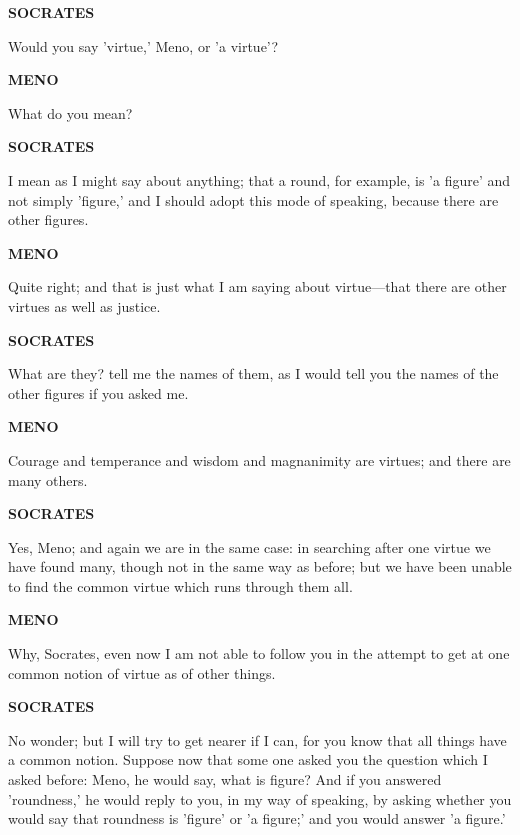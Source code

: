 \documentclass[11pt,letter]{article}
\begin{document}
\par \textbf{SOCRATES}
\par   Would you say 'virtue,' Meno, or 'a virtue'?

\par \textbf{MENO}
\par   What do you mean?

\par \textbf{SOCRATES}
\par   I mean as I might say about anything; that a round, for example, is 'a figure' and not simply 'figure,' and I should adopt this mode of speaking, because there are other figures.

\par \textbf{MENO}
\par   Quite right; and that is just what I am saying about virtue—that there are other virtues as well as justice.

\par \textbf{SOCRATES}
\par   What are they? tell me the names of them, as I would tell you the names of the other figures if you asked me.

\par \textbf{MENO}
\par   Courage and temperance and wisdom and magnanimity are virtues; and there are many others.

\par \textbf{SOCRATES}
\par   Yes, Meno; and again we are in the same case:  in searching after one virtue we have found many, though not in the same way as before; but we have been unable to find the common virtue which runs through them all.

\par \textbf{MENO}
\par   Why, Socrates, even now I am not able to follow you in the attempt to get at one common notion of virtue as of other things.

\par \textbf{SOCRATES}
\par   No wonder; but I will try to get nearer if I can, for you know that all things have a common notion. Suppose now that some one asked you the question which I asked before:  Meno, he would say, what is figure? And if you answered 'roundness,' he would reply to you, in my way of speaking, by asking whether you would say that roundness is 'figure' or 'a figure;' and you would answer 'a figure.'
\end{document}
